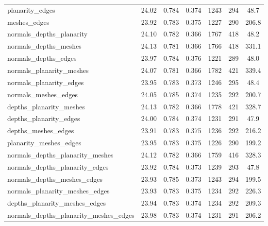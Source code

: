 \begin{table}[h]
{\begin{tabular}{@{}l|ccc|ccc@{}}
planarity\_edges & 24.02 & \cellcolor{green!40}0.784 & 0.374 & 1243 & 294 & 48.7 \\
meshes\_edges & 23.92 & 0.783 & 0.375 & \cellcolor{green!20}1227 & \cellcolor{green!40}290 & 206.8 \\
\midrule
normals\_depths\_planarity & 24.10 & \cellcolor{green!20}0.782 & \cellcolor{green!70}0.366 & 1767 & 418 & 48.2 \\
normals\_depths\_meshes & \cellcolor{green!70}24.13 & 0.781 & \cellcolor{green!70}0.366 & 1766 & 418 & 331.1 \\
normals\_depths\_edges & 23.97 & \cellcolor{green!40}0.784 & 0.376 & \cellcolor{green!70}1221 & \cellcolor{green!70}289 & \cellcolor{green!40}48.0 \\
normals\_planarity\_meshes & 24.07 & 0.781 & \cellcolor{green!70}0.366 & 1782 & 421 & 339.4 \\
normals\_planarity\_edges & 23.95 & 0.783 & \cellcolor{green!20}0.373 & 1246 & 295 & 48.4 \\
normals\_meshes\_edges & 24.05 & \cellcolor{green!70}0.785 & 0.374 & 1235 & 292 & 200.7 \\
depths\_planarity\_meshes & \cellcolor{green!70}24.13 & \cellcolor{green!20}0.782 & \cellcolor{green!70}0.366 & 1778 & 421 & 328.7 \\
depths\_planarity\_edges & 24.00 & \cellcolor{green!40}0.784 & 0.374 & 1231 & \cellcolor{green!20}291 & 47.9 \\
depths\_meshes\_edges & 23.91 & 0.783 & 0.375 & 1236 & 292 & 216.2 \\
planarity\_meshes\_edges & 23.95 & 0.783 & 0.375 & \cellcolor{green!40}1226 & \cellcolor{green!40}290 & 199.2 \\
\midrule
normals\_depths\_planarity\_meshes & \cellcolor{green!40}24.12 & \cellcolor{green!20}0.782 & \cellcolor{green!70}0.366 & 1759 & 416 & 328.3 \\
normals\_depths\_planarity\_edges & 23.92 & \cellcolor{green!40}0.784 & \cellcolor{green!20}0.373 & 1239 & 293 & \cellcolor{green!20}47.8 \\
normals\_depths\_meshes\_edges & 23.93 & \cellcolor{green!70}0.785 & \cellcolor{green!20}0.373 & 1243 & 294 & 199.5 \\
normals\_planarity\_meshes\_edges & 23.93 & 0.783 & 0.375 & 1234 & 292 & 226.3 \\
depths\_planarity\_meshes\_edges & 23.94 & 0.783 & 0.374 & 1234 & 292 & 209.3 \\
\midrule
normals\_depths\_planarity\_meshes\_edges & 23.98 & 0.783 & 0.374 & 1231 & \cellcolor{green!20}291 & 206.2 \\
\bottomrule
\end{tabular}%
}
\end{table}

